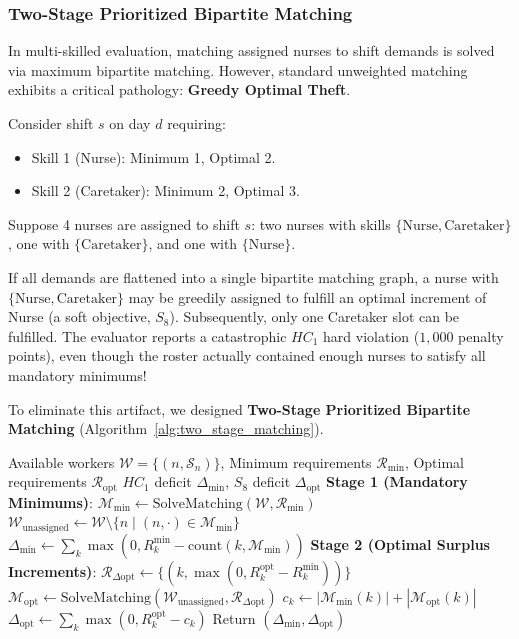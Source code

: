 \documentclass[10pt,journal,compsoc]{IEEEtran}
\begin{document}
\subsubsection{Two-Stage Prioritized Bipartite Matching}
In multi-skilled evaluation, matching assigned nurses to shift demands is solved via maximum bipartite matching. However, standard unweighted matching exhibits a critical pathology: \textbf{Greedy Optimal Theft}.

Consider shift $s$ on day $d$ requiring:
\begin{itemize}
    \item Skill 1 (Nurse): Minimum 1, Optimal 2.
    \item Skill 2 (Caretaker): Minimum 2, Optimal 3.
\end{itemize}
Suppose 4 nurses are assigned to shift $s$: two nurses with skills $\{\text{Nurse}, \text{Caretaker}\}$, one with $\{\text{Caretaker}\}$, and one with $\{\text{Nurse}\}$.

If all demands are flattened into a single bipartite matching graph, a nurse with $\{\text{Nurse}, \text{Caretaker}\}$ may be greedily assigned to fulfill an optimal increment of Nurse (a soft objective, $S_8$). Subsequently, only one Caretaker slot can be fulfilled. The evaluator reports a catastrophic $HC_1$ hard violation ($1,000$ penalty points), even though the roster actually contained enough nurses to satisfy all mandatory minimums!

To eliminate this artifact, we designed \textbf{Two-Stage Prioritized Bipartite Matching} (Algorithm~\ref{alg:two_stage_matching}).

\begin{algorithm}[t]
\caption{Two-Stage Prioritized Bipartite Matching}
\label{alg:two_stage_matching}
\begin{algorithmic}[1]
\REQUIRE Available workers $\mathcal{W} = \{(n, \mathcal{S}_n)\}$, Minimum requirements $\mathcal{R}_{\min}$, Optimal requirements $\mathcal{R}_{\text{opt}}$
\ENSURE $HC_1$ deficit $\Delta_{\min}$, $S_8$ deficit $\Delta_{\text{opt}}$
\STATE \textbf{Stage 1 (Mandatory Minimums)}:
\STATE $\mathcal{M}_{\min} \leftarrow \text{SolveMatching}(\mathcal{W}, \mathcal{R}_{\min})$
\STATE $\mathcal{W}_{\text{unassigned}} \leftarrow \mathcal{W} \setminus \{n \mid (n, \cdot) \in \mathcal{M}_{\min}\}$
\STATE $\Delta_{\min} \leftarrow \sum_{k} \max(0, R_{k}^{\min} - \text{count}(k, \mathcal{M}_{\min}))$
\STATE \textbf{Stage 2 (Optimal Surplus Increments)}:
\STATE $\mathcal{R}_{\Delta \text{opt}} \leftarrow \{(k, \max(0, R_{k}^{\text{opt}} - R_{k}^{\min}))\}$
\STATE $\mathcal{M}_{\text{opt}} \leftarrow \text{SolveMatching}(\mathcal{W}_{\text{unassigned}}, \mathcal{R}_{\Delta \text{opt}})$
\STATE $c_k \leftarrow |\mathcal{M}_{\min}(k)| + |\mathcal{M}_{\text{opt}}(k)|$
\STATE $\Delta_{\text{opt}} \leftarrow \sum_{k} \max(0, R_{k}^{\text{opt}} - c_k)$
\STATE Return $(\Delta_{\min}, \Delta_{\text{opt}})$
\end{algorithmic}
\end{algorithm}
\end{document}

